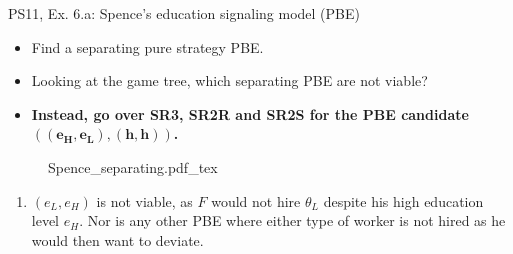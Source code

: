 \begin{frame}{PS11, Ex. 6.a: Spence’s education signaling model (PBE)}
    \begin{multicols}{2}
      \begin{itemize}
        \item[(a)] Find a separating pure strategy PBE.
        \item[Step 1:] Looking at the game tree, which separating PBE are not viable?
        \item[Step 2:] \textbf{Instead, go over SR3, SR2R and SR2S for the PBE candidate $\bm{((e_H,e_L),(h,h))}$.}
      \end{itemize}\vspace{-6pt}
      \vfill\null\columnbreak
      \begin{figure}[!h]
        \center{}
        {Spence_separating.pdf_tex}
      \end{figure}\vspace{-6pt}
      \begin{enumerate}
        \item $(e_L,e_H)$ is not viable, as $F$ would not hire $\theta_L$ despite his high education level $e_H$. Nor is any other PBE where either type of worker is not hired as he would then want to deviate.
      \end{enumerate}
      \vfill\null
    \end{multicols}
\end{frame}
